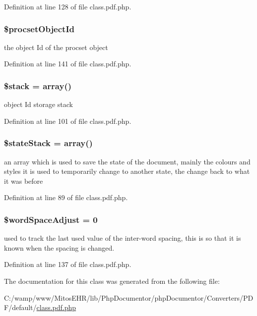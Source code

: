 \-Definition at line 128 of file class.\-pdf.\-php.

\hypertarget{class_cpdf_a39e9c2190f8061439c35f7d2a8240318}{
\subsubsection[{\$procset\-Object\-Id}]{\setlength{\rightskip}{0pt plus 5cm}\$procset\-Object\-Id}}\label{class_cpdf_a39e9c2190f8061439c35f7d2a8240318}
the object \-Id of the procset object 

\-Definition at line 141 of file class.\-pdf.\-php.

\hypertarget{class_cpdf_a6a0169b26b5301f906b1ec481b3f1eea}{
\subsubsection[{\$stack}]{\setlength{\rightskip}{0pt plus 5cm}\$stack = array()}}\label{class_cpdf_a6a0169b26b5301f906b1ec481b3f1eea}
object \-Id storage stack 

\-Definition at line 101 of file class.\-pdf.\-php.

\hypertarget{class_cpdf_af19bb712a3b92c4f0fbcdf1add3f0bdd}{
\subsubsection[{\$state\-Stack}]{\setlength{\rightskip}{0pt plus 5cm}\$state\-Stack = array()}}\label{class_cpdf_af19bb712a3b92c4f0fbcdf1add3f0bdd}
an array which is used to save the state of the document, mainly the colours and styles it is used to temporarily change to another state, the change back to what it was before 

\-Definition at line 89 of file class.\-pdf.\-php.

\hypertarget{class_cpdf_a32de4c103af0783f44fd568d74c6454b}{
\subsubsection[{\$word\-Space\-Adjust}]{\setlength{\rightskip}{0pt plus 5cm}\$word\-Space\-Adjust = 0}}\label{class_cpdf_a32de4c103af0783f44fd568d74c6454b}
used to track the last used value of the inter-\/word spacing, this is so that it is known when the spacing is changed. 

\-Definition at line 137 of file class.\-pdf.\-php.



\-The documentation for this class was generated from the following file\-:\begin{DoxyCompactItemize}
\item 
\-C\-:/wamp/www/\-Mitos\-E\-H\-R/lib/\-Php\-Documentor/php\-Documentor/\-Converters/\-P\-D\-F/default/\hyperlink{class_8pdf_8php}{class.\-pdf.\-php}\end{DoxyCompactItemize}
